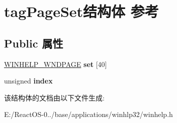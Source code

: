 \hypertarget{structtag_page_set}{}\section{tag\+Page\+Set结构体 参考}
\label{structtag_page_set}
\subsection*{Public 属性}
\begin{DoxyCompactItemize}
\item 
\mbox{\label{structtag_page_set_a0e16e0dd7d6d11b74d5a11dbaff7cfed}} 
\hyperlink{struct_w_i_n_h_e_l_p___w_n_d_p_a_g_e}{W\+I\+N\+H\+E\+L\+P\+\_\+\+W\+N\+D\+P\+A\+GE} {\bfseries set} \mbox{[}40\mbox{]}
\item 
\mbox{\label{structtag_page_set_af009f93f0bc90fbac38ddd6565b4cfe1}} 
unsigned {\bfseries index}
\end{DoxyCompactItemize}


该结构体的文档由以下文件生成\+:\begin{DoxyCompactItemize}
\item 
E\+:/\+React\+O\+S-\/0../base/applications/winhlp32/winhelp.\+h\end{DoxyCompactItemize}
